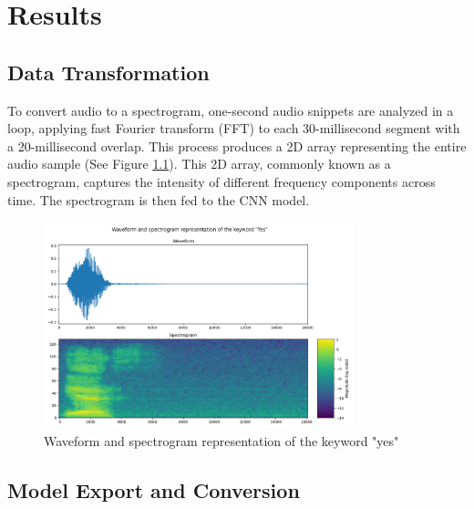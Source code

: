 %
%


\chapter{Results}


\section{Data Transformation}

To convert audio to a spectrogram, one-second audio snippets are analyzed in a loop, applying fast Fourier transform (FFT) to each 30-millisecond segment with a 20-millisecond overlap. This process produces a 2D array representing the entire audio sample (See Figure \ref{fig:audioWaveSpectrogramYes}). This 2D array, commonly known as a spectrogram, captures the intensity of different frequency components across time. The spectrogram is then fed to the CNN model.

\begin{figure}[h!]
	\centering
	\includegraphics[width=0.8\textwidth]{Images/Results/audioWaveSpectrogramYes}
	\caption{Waveform and spectrogram representation of the keyword "yes"} \label{fig:audioWaveSpectrogramYes}
\end{figure}

\section{Model Export and Conversion}

